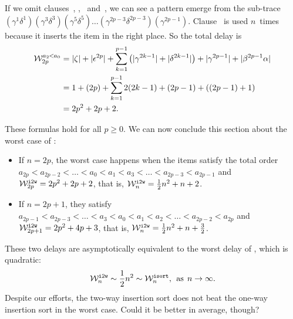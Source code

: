 \begin{itemize}
\begin{alltt}
\end{alltt}
If we omit clauses~\clause{\zeta}, \clause{\epsilon},
\clause{\alpha}~and~\clause{\beta}, we can see a pattern emerge from
the sub\hyp{}trace
\((\gamma^1\delta^1)(\gamma^3\delta^3)(\gamma^5\delta^5) \ldots
(\gamma^{2p-3}\delta^{2p-3})(\gamma^{2p-1})\). Clause~\clause{\epsilon}
is used \(n\)~times because it inserts the item in the right place. So
the total delay is
\begin{align*}
\worst{\(a_2\!\!<\!\!a_0\)}{2p}
   &= \abs{\zeta} + \abs{\epsilon^{2p}}
           + \sum_{k=1}^{p-1}{\left(\abs{\gamma^{2k-1}} + \abs{\delta^{2k-1}}\right)}
           + \abs{\gamma^{2p-1}} + \abs{\beta^{2p-1}\alpha}\\
   &= 1 + (2p) + \sum_{k=1}^{p-1}{2(2k-1)} + (2p-1) + ((2p - 1) + 1)\\
   &= 2p^2 + 2p + 2.
\end{align*}
\end{itemize}
These formulas hold for all \(p\geqslant{}0\). We can now conclude
this section about the worst case of :
\begin{itemize}

  \item If \(n = 2p\), the worst case happens when the items satisfy
    the total order \(a_{2p} < a_{2p-2} < \dots < a_0 < a_1 < a_3 <
    \dots < a_{2p-3} < a_{2p-1}\) and \(\worst{i2w}{2p} = 2p^2 + 2p +
    2\), that is, \(\worst{i2w}{n} = \frac{1}{2}{n^2} + n + 2\).

  \item If \(n = 2p+1\), they satisfy \(a_{2p-1} < a_{2p-3} < \dots <
    a_3 < a_0 < a_1 < a_2 < \dots < a_{2p-2} < a_{2p}\) and
    \(\worst{i2w}{2p+1} = 2p^2 + 4p + 3\), that is, \(\worst{i2w}{n} =
    \frac{1}{2}{n^2} + n + \frac{3}{2}\).

\end{itemize}
These two delays are asymptotically equivalent to the worst delay of
, which is quadratic:
\[
\worst{i2w}{n} \mathrel{\sim} \frac{1}{2}{n^2} \mathrel{\sim}
\worst{isort}{n},\,\; \text{as} \,\; n \rightarrow \infty.
\]
Despite our efforts, the two\hyp{}way insertion sort does not beat the
one\hyp{}way insertion sort in the worst case. Could it be better in
average, though?

